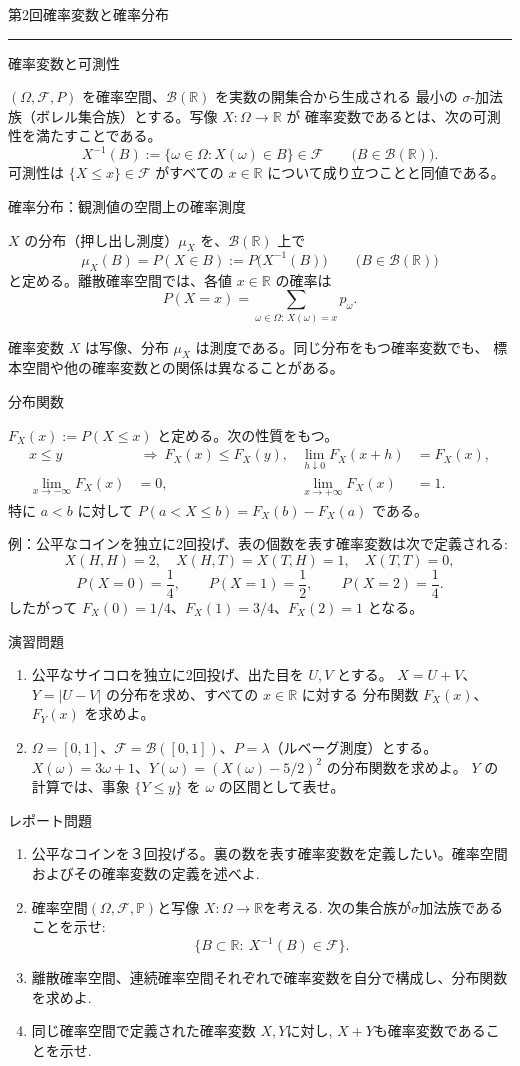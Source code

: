 \documentclass[a4paper,10pt,pdflatex,ja=standard,jafont=ipaex-type1,
  magstyle=real,scale=1]{bxjsarticle}
\newcommand{\topic}[1]{\par\vspace{5pt}
  {\large\sffamily\mdseries\color{accent}#1}\par\vspace{2pt}}
\newcommand{\handouttitle}[1]{%
  \begin{center}
    {\Large\color{ink}#1}\par\vspace{3mm}
    {\color{accent}\rule{0.88\linewidth}{0.7pt}}
  \end{center}\vspace{-2mm}}
\newcommand{\keybox}[1]{\par\vspace{3pt}\begingroup
  \setlength{\fboxsep}{5pt}
  \colorbox{soft}{\parbox{\dimexpr\linewidth-2\fboxsep\relax}{#1}}%
  \endgroup\par\vspace{2pt}}
\newcommand{\examplelabel}[1]{{\sffamily\mdseries\color{ink}#1}}
\newcommand{\F}{\mathcal F}
\newcommand{\R}{\mathbb R}
\begin{document}
\fontsize{10pt}{13.5pt}\selectfont
\handouttitle{第2回\quad 確率変数と確率分布}

\topic{確率変数と可測性}
$(\Omega,\F,P)$ を確率空間、$\mathcal B(\R)$ を実数の開集合から生成される
最小の $\sigma$-加法族（ボレル集合族）とする。写像 $X:\Omega\to\R$ が
確率変数であるとは、次の可測性を満たすことである。
$$
  X^{-1}(B):=\{\omega\in\Omega:X(\omega)\in B\}\in\F
  \qquad\bigl(B\in\mathcal B(\R)\bigr).
$$
可測性は $\{X\le x\}\in\F$ がすべての $x\in\R$ について成り立つことと同値である。

\topic{確率分布：観測値の空間上の確率測度}
$X$ の分布（押し出し測度）$\mu_X$ を、$\mathcal B(\R)$ 上で
$$
  \mu_X(B)=P(X\in B):=P\bigl(X^{-1}(B)\bigr)
  \qquad\bigl(B\in\mathcal B(\R)\bigr)
$$
と定める。離散確率空間では、各値 $x\in\R$ の確率は
$$
  P(X=x)=\sum_{\omega\in\Omega:\,X(\omega)=x}p_\omega.
$$
\keybox{確率変数 $X$ は写像、分布 $\mu_X$ は測度である。同じ分布をもつ確率変数でも、
標本空間や他の確率変数との関係は異なることがある。}

\topic{分布関数}
$F_X(x):=P(X\le x)$ と定める。次の性質をもつ。
$$
  \begin{aligned}
    x\le y&\ \Longrightarrow\ F_X(x)\le F_X(y),
    &\lim_{h\downarrow0}F_X(x+h)&=F_X(x),\\
    \lim_{x\to-\infty}F_X(x)&=0,
    &\lim_{x\to+\infty}F_X(x)&=1.
  \end{aligned}
$$
特に $a<b$ に対して $P(a<X\le b)=F_X(b)-F_X(a)$ である。

\examplelabel{例：公平なコインを独立に2回投げ、表の個数を表す確率変数は次で定義される:}
$$
  X(H,H)=2,\quad X(H,T)=X(T,H)=1,\quad X(T,T)=0,
$$
$$
  P(X=0)=\frac14,\qquad P(X=1)=\frac12,\qquad P(X=2)=\frac14.
$$
したがって $F_X(0)=1/4$、$F_X(1)=3/4$、$F_X(2)=1$ となる。

\topic{演習問題}
\begin{enumerate}[label=\arabic*.]
  \item 公平なサイコロを独立に2回投げ、出た目を $U,V$ とする。
  $X=U+V$、$Y=|U-V|$ の分布を求め、すべての $x\in\R$ に対する
  分布関数 $F_X(x)$、$F_Y(x)$ を求めよ。
  \item $\Omega=[0,1]$、$\F=\mathcal B([0,1])$、$P=\lambda$（ルベーグ測度）とする。
  $X(\omega)=3\omega+1$、$Y(\omega)=(X(\omega)-5/2)^2$ の分布関数を求めよ。
  $Y$ の計算では、事象 $\{Y\le y\}$ を $\omega$ の区間として表せ。
\end{enumerate}

\topic{レポート問題}
\begin{enumerate}[label=\arabic*.]
  \item 公平なコインを３回投げる。裏の数を表す確率変数を定義したい。確率空間およびその確率変数の定義を述べよ.
  \item 確率空間$(\Omega,\mathcal F,\mathbb P)$と写像 $X:\Omega\to \mathbb R$を考える. 次の集合族が$\sigma$加法族であることを示せ:
$$\{B\subset \mathbb R:~X^{-1}(B) \in \mathcal F\}.$$
  \item 離散確率空間、連続確率空間それぞれで確率変数を自分で構成し、分布関数を求めよ.
  \item 同じ確率空間で定義された確率変数 $X,Y$に対し, $X+Y$も確率変数であることを示せ.
\end{enumerate}
\end{document}
